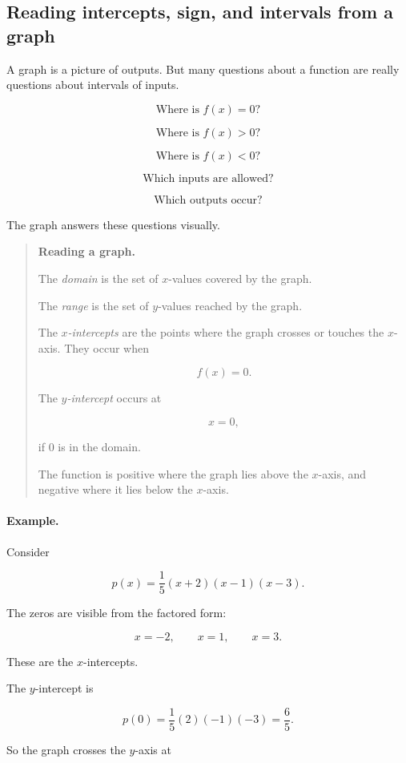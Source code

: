 \subsection{Reading intercepts, sign, and intervals from a graph}
\label{subsec:reading-intercepts-sign-intervals}

A graph is a picture of outputs. But many questions about a function are really questions about intervals of inputs.

\[
\text{Where is }f(x)=0?
\]

\[
\text{Where is }f(x)>0?
\]

\[
\text{Where is }f(x)<0?
\]

\[
\text{Which inputs are allowed?}
\]

\[
\text{Which outputs occur?}
\]

The graph answers these questions visually.

\begin{quote}
\textbf{Reading a graph.}

The \emph{domain} is the set of \(x\)-values covered by the graph.

The \emph{range} is the set of \(y\)-values reached by the graph.

The \emph{\(x\)-intercepts} are the points where the graph crosses or touches the \(x\)-axis. They occur when

\[
f(x)=0.
\]

The \emph{\(y\)-intercept} occurs at

\[
x=0,
\]

if \(0\) is in the domain.

The function is positive where the graph lies above the \(x\)-axis, and negative where it lies below the \(x\)-axis.
\end{quote}

\paragraph{Example.}
Consider

\[
p(x)=\frac15(x+2)(x-1)(x-3).
\]

The zeros are visible from the factored form:

\[
x=-2,\qquad x=1,\qquad x=3.
\]

These are the \(x\)-intercepts.

The \(y\)-intercept is

\[
p(0)=\frac15(2)(-1)(-3)=\frac65.
\]

So the graph crosses the \(y\)-axis at

